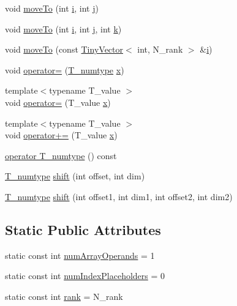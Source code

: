 \begin{DoxyCompactItemize}
void \hyperlink{classFastArrayIterator_a305c2c5240a2a5addbf0474f4114d587}{move\+To} (int \hyperlink{indexexpr_8h_aabd77643995707c185e95c8cb2782c81}{i}, int \hyperlink{indexexpr_8h_aa1f3325d66516548e69238097857fa98}{j})
\item 
void \hyperlink{classFastArrayIterator_a6e580cb937fd65aec75d03c127dc3056}{move\+To} (int \hyperlink{indexexpr_8h_aabd77643995707c185e95c8cb2782c81}{i}, int \hyperlink{indexexpr_8h_aa1f3325d66516548e69238097857fa98}{j}, int \hyperlink{indexexpr_8h_abb72938a198351550846b37a84588b63}{k})
\item 
void \hyperlink{classFastArrayIterator_af4f93e6d2c5d58306dca3951b23d2aa9}{move\+To} (const \hyperlink{classTinyVector}{Tiny\+Vector}$<$ int, N\+\_\+rank $>$ \&\hyperlink{indexexpr_8h_aabd77643995707c185e95c8cb2782c81}{i})
\item 
void \hyperlink{classFastArrayIterator_afbebeb04ed64a04275773738554c2f5d}{operator=} (\hyperlink{classFastArrayIterator_a6b72f4ef8bfecc51f2f93b89b21d5033}{T\+\_\+numtype} \hyperlink{vecnorm1_8cc_ac73eed9e41ec09d58f112f06c2d6cb63}{x})
\item 
{\footnotesize template$<$typename T\+\_\+value $>$ }\\void \hyperlink{classFastArrayIterator_aa39b105c096035a19a95e161479ecb55}{operator=} (T\+\_\+value \hyperlink{vecnorm1_8cc_ac73eed9e41ec09d58f112f06c2d6cb63}{x})
\item 
{\footnotesize template$<$typename T\+\_\+value $>$ }\\void \hyperlink{classFastArrayIterator_a04ac4a5fdf0c80bb7d948c867f884916}{operator+=} (T\+\_\+value \hyperlink{vecnorm1_8cc_ac73eed9e41ec09d58f112f06c2d6cb63}{x})
\item 
\hyperlink{classFastArrayIterator_ad51883c4fae250a5f56944a934e04880}{operator T\+\_\+numtype} () const 
\item 
\hyperlink{classFastArrayIterator_a6b72f4ef8bfecc51f2f93b89b21d5033}{T\+\_\+numtype} \hyperlink{classFastArrayIterator_a52d2f4b8272281c7bdb44c4cb16f3277}{shift} (int offset, int dim)
\item 
\hyperlink{classFastArrayIterator_a6b72f4ef8bfecc51f2f93b89b21d5033}{T\+\_\+numtype} \hyperlink{classFastArrayIterator_a7b83c13d57df5a31abb1020fdc57c0bc}{shift} (int offset1, int dim1, int offset2, int dim2)
\end{DoxyCompactItemize}
\subsection*{Static Public Attributes}
\begin{DoxyCompactItemize}
\item 
static const int \hyperlink{classFastArrayIterator_ab060f8e5607dee2569f294d6047f26c5}{num\+Array\+Operands} = 1
\item 
static const int \hyperlink{classFastArrayIterator_a6d17ed18a8b7aa110e80ea8c45c07469}{num\+Index\+Placeholders} = 0
\item 
static const int \hyperlink{classFastArrayIterator_a51a4638ef5e68f65172cfbdb764e28ac}{rank} = N\+\_\+rank
\end{DoxyCompactItemize}


